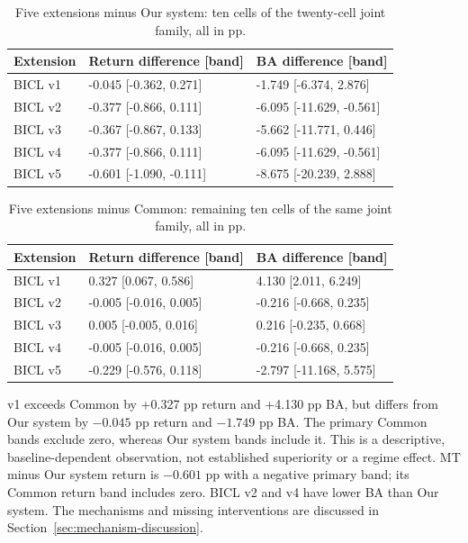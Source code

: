 \begin{table}[!htb]\centering\small{}\setlength{\tabcolsep}{4pt}
\caption[Complete joint-family contrasts against Our system]{Five extensions minus Our system: ten cells of the twenty-cell joint family, all in pp.}\label{tab:vsnative}
\begin{tabular}{@{}P{.17\linewidth}P{.36\linewidth}P{.36\linewidth}@{}}\toprule
Extension & Return difference [band] & BA difference [band]\\\midrule
BICL v1 & -0.045 {[}-0.362, 0.271{]} & -1.749 {[}-6.374, 2.876{]}\\
BICL v2 & -0.377 {[}-0.866, 0.111{]} & -6.095 {[}-11.629, -0.561{]}\\
BICL v3 & -0.367 {[}-0.867, 0.133{]} & -5.662 {[}-11.771, 0.446{]}\\
BICL v4 & -0.377 {[}-0.866, 0.111{]} & -6.095 {[}-11.629, -0.561{]}\\
BICL v5 & -0.601 {[}-1.090, -0.111{]} & -8.675 {[}-20.239, 2.888{]}\\
\bottomrule\end{tabular}\end{table}

\begin{table}[!htb]\centering\small{}\setlength{\tabcolsep}{4pt}
\caption[Complete joint-family contrasts against Common]{Five extensions minus Common: remaining ten cells of the same joint family, all in pp.}\label{tab:vscommon}
\begin{tabular}{@{}P{.17\linewidth}P{.36\linewidth}P{.36\linewidth}@{}}\toprule
Extension & Return difference [band] & BA difference [band]\\\midrule
BICL v1 & 0.327 {[}0.067, 0.586{]} & 4.130 {[}2.011, 6.249{]}\\
BICL v2 & -0.005 {[}-0.016, 0.005{]} & -0.216 {[}-0.668, 0.235{]}\\
BICL v3 & 0.005 {[}-0.005, 0.016{]} & 0.216 {[}-0.235, 0.668{]}\\
BICL v4 & -0.005 {[}-0.016, 0.005{]} & -0.216 {[}-0.668, 0.235{]}\\
BICL v5 & -0.229 {[}-0.576, 0.118{]} & -2.797 {[}-11.168, 5.575{]}\\
\bottomrule\end{tabular}\end{table}

v1 exceeds Common by +0.327 pp return and +4.130 pp BA, but differs from
Our system by $-0.045$ pp return and $-1.749$ pp BA. The primary Common bands
exclude zero, whereas Our system bands include it. This is a descriptive,
baseline-dependent observation, not established superiority or a regime
effect. MT minus Our system return is $-0.601$ pp with a negative primary
band; its Common return band includes zero. BICL v2 and v4 have lower BA than Our system. The mechanisms and missing interventions are discussed in
Section~\ref{sec:mechanism-discussion}.

